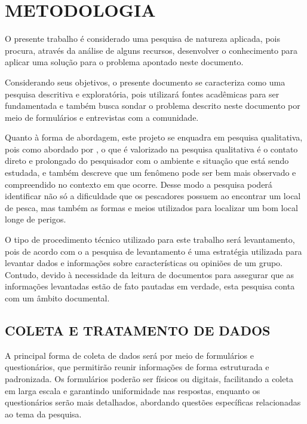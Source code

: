
\chapter{METODOLOGIA}
\label{chap:metodologia}

O presente trabalho é considerado uma pesquisa de natureza aplicada, pois procura, através da análise de alguns recursos, desenvolver o conhecimento para aplicar uma solução para o problema apontado neste documento.

Considerando seus objetivos, o presente documento se caracteriza como uma pesquisa descritiva e exploratória, pois utilizará fontes acadêmicas para ser fundamentada e também busca sondar o problema descrito neste documento por meio de formulários e entrevistas com a comunidade.

Quanto à forma de abordagem, este projeto se enquadra em pesquisa qualitativa, pois como abordado por , o que é valorizado na pesquisa qualitativa é o contato direto e prolongado do pesquisador com o ambiente e situação que está sendo estudada, e também descreve que um fenômeno pode ser bem mais observado e compreendido no contexto em que ocorre. Desse modo a pesquisa poderá identificar não só a dificuldade que os pescadores possuem ao encontrar um local de pesca, mas também as formas e meios utilizados para localizar um bom local longe de perigos.

O tipo de procedimento técnico utilizado para este trabalho será levantamento, pois de acordo com o  a pesquisa de levantamento é uma estratégia utilizada para levantar dados e informações sobre características ou opiniões de um grupo. Contudo, devido à necessidade da leitura de documentos para assegurar que as informações levantadas estão de fato pautadas em verdade, esta pesquisa conta com um âmbito documental.

\section{COLETA E TRATAMENTO DE DADOS}
\label{sec:titSecColDad}

A principal forma de coleta de dados será por meio de formulários e questionários, que permitirão reunir informações de forma estruturada e padronizada. Os formulários poderão ser físicos ou digitais, facilitando a coleta em larga escala e garantindo uniformidade nas respostas, enquanto os questionários serão mais detalhados, abordando questões específicas relacionadas ao tema da pesquisa.


